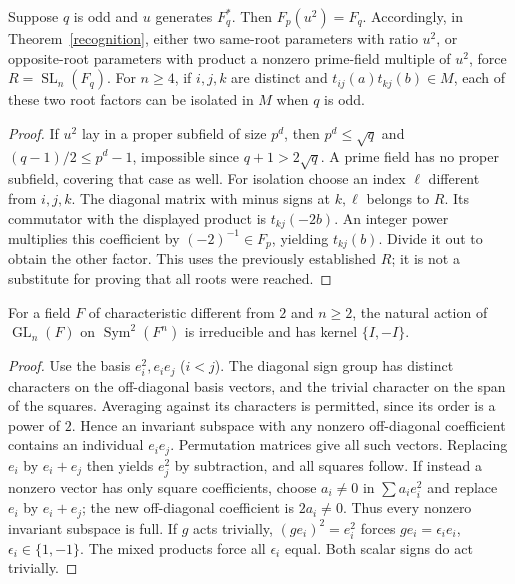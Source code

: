 \documentclass[11pt]{article}
\newcommand{\GL}{\operatorname{GL}}\newcommand{\SL}{\operatorname{SL}}
\newcommand{\Sym}{\operatorname{Sym}}\newcommand{\im}{\operatorname{im}}
\begin{document}
\begin{corollary}\label{square}
Suppose $q$ is odd and $u$ generates $F_q^*$. Then $F_p(u^2)=F_q$.
Accordingly, in Theorem~\ref{recognition}, either two same-root parameters
with ratio $u^2$, or opposite-root parameters with product a nonzero
prime-field multiple of $u^2$, force $R=\SL_n(F_q)$.
For $n\geq4$, if $i,j,k$ are distinct and
$t_{ij}(a)t_{kj}(b)\in M$, each of these two root factors can be isolated
in $M$ when $q$ is odd.
\end{corollary}
\begin{proof}
If $u^2$ lay in a proper subfield of size $p^d$, then $p^d\leq\sqrt q$
and $(q-1)/2\leq p^d-1$, impossible since $q+1>2\sqrt q$. A prime field
has no proper subfield, covering that case as well.
For isolation choose an index $\ell$ different from $i,j,k$. The diagonal
matrix with minus signs at $k,\ell$ belongs to $R$. Its commutator with
the displayed product is $t_{kj}(-2b)$. An integer power multiplies this
coefficient by $(-2)^{-1}\in F_p$, yielding $t_{kj}(b)$. Divide it out to
obtain the other factor. This uses the previously established $R$; it is
not a substitute for proving that all roots were reached.
\end{proof}

\begin{lemma}\label{symmetric}
For a field $F$ of characteristic different from $2$ and $n\geq2$, the
natural action of $\GL_n(F)$ on $\Sym^2(F^n)$ is irreducible and has
kernel $\{I,-I\}$.
\end{lemma}
\begin{proof}
Use the basis $e_i^2,e_ie_j$ ($i<j$). The diagonal sign group has distinct
characters on the off-diagonal basis vectors, and the trivial character
on the span of the squares. Averaging against its characters is permitted,
since its order is a power of $2$. Hence an invariant subspace with any
nonzero off-diagonal coefficient contains an individual $e_ie_j$.
Permutation matrices give all such vectors. Replacing $e_i$ by $e_i+e_j$
then yields $e_j^2$ by subtraction, and all squares follow. If instead a
nonzero vector has only square coefficients, choose $a_i\ne0$ in
$\sum a_ie_i^2$ and replace $e_i$ by $e_i+e_j$; the new off-diagonal
coefficient is $2a_i\ne0$. Thus every nonzero invariant subspace is full.
If $g$ acts trivially, $(ge_i)^2=e_i^2$ forces $ge_i=\epsilon_i e_i$,
$\epsilon_i\in\{1,-1\}$. The mixed products force all $\epsilon_i$ equal.
Both scalar signs do act trivially.
\end{proof}
\end{document}

